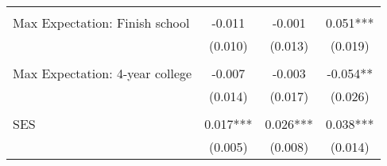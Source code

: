 {\begin{tabular}{lccc}
&  &  &   \\
\hspace{3mm}Max Expectation: Finish school&      -0.011   &      -0.001   &       0.051***\\
                    &     (0.010)   &     (0.013)   &     (0.019)   \\
 
&  &  &   \\
\hspace{3mm}Max Expectation: 4-year college&      -0.007   &      -0.003   &      -0.054** \\
                    &     (0.014)   &     (0.017)   &     (0.026)   \\
 
&  &  &   \\
\hspace{3mm}SES     &       0.017***&       0.026***&       0.038***\\
                    &     (0.005)   &     (0.008)   &     (0.014)   \\
 

\bottomrule
\end{tabular}
}
